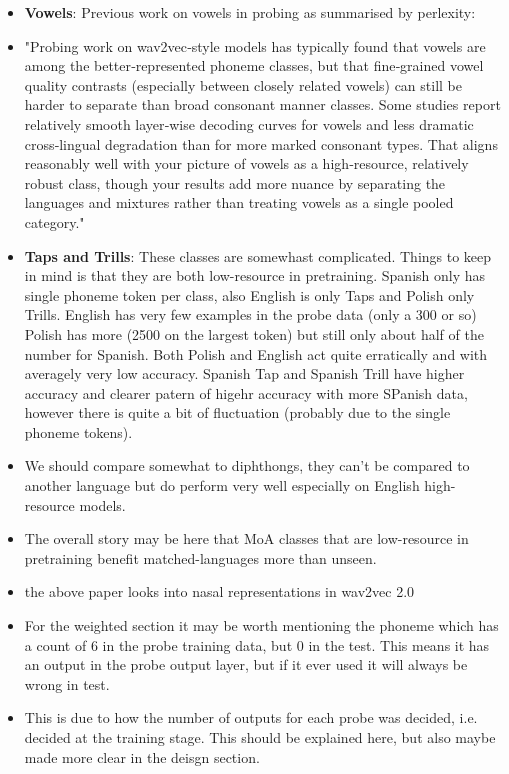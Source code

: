 \begin{itemize}
    \item \textbf{Vowels}: Previous work on vowels in probing as summarised by perlexity:
    \item "Probing work on wav2vec‑style models has typically found that vowels are among the better‑represented phoneme classes, but that fine‑grained vowel quality contrasts (especially between closely related vowels) can still be harder to separate than broad consonant manner classes. Some studies report relatively smooth layer‑wise decoding curves for vowels and less dramatic cross‑lingual degradation than for more marked consonant types. That aligns reasonably well with your picture of vowels as a high‑resource, relatively robust class, though your results add more nuance by separating the languages and mixtures rather than treating vowels as a single pooled category."

    \item \textbf{Taps and Trills}: These classes are somewhast complicated. Things to keep in mind is that they are both low-resource in pretraining. Spanish only has single phoneme token per class, also English is only Taps and Polish only Trills. English has very few examples in the probe data (only a 300 or so) Polish has more (2500 on the largest token) but still only about half of the number for Spanish. Both Polish and English act quite erratically and with averagely very low accuracy. Spanish Tap and Spanish Trill have higher accuracy and clearer patern of higehr accuracy with more SPanish data, however there is quite a bit of fluctuation (probably due to the single phoneme tokens). 
    \item We should compare somewhat to diphthongs, they can't be compared to another language but do perform very well especially on English high-resource models.
    \item The overall story may be here that MoA classes that are low-resource in pretraining benefit matched-languages more than unseen.

    \item the above paper looks into nasal representations in wav2vec 2.0
    
    \item For the weighted section it may be worth mentioning the phoneme  which has a count of 6 in the probe training data, but 0 in the test. This means it has an output in the probe output layer, but if it ever used it will always be wrong in test.
    \item This is due to how the number of outputs for each probe was decided, i.e. decided at the training stage. This should be explained here, but also maybe made more clear in the deisgn section.
\end{itemize}

